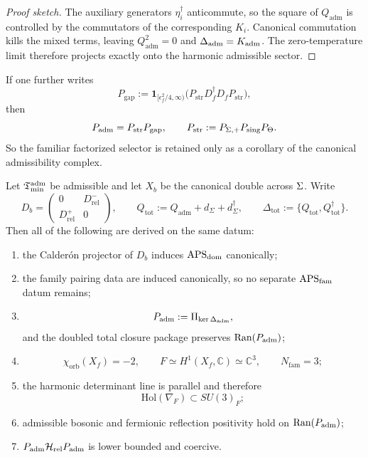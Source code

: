 \begin{proof}[Proof sketch]
The auxiliary generators $\eta_i^\dagger$ anticommute, so the square of $Q_{\mathrm{adm}}$
is controlled by the commutators of the corresponding $K_i$. Canonical commutation kills the
mixed terms, leaving $Q_{\mathrm{adm}}^2=0$ and $\Delta_{\mathrm{adm}}=K_{\mathrm{adm}}$. The
zero-temperature limit therefore projects exactly onto the harmonic admissible sector.
\end{proof}

\begin{corollary}
\label{cor:factorized-admissibility-selector}
If one further writes
\[
P_{\mathrm{gap}}:=\mathbf 1_{[\epsilon_f^2/4,\infty)}\!\bigl(P_{\mathrm{str}}D_f^\dagger D_f P_{\mathrm{str}}\bigr),
\]
then
\[
P_{\mathrm{adm}}=P_{\mathrm{str}}P_{\mathrm{gap}},
\qquad
P_{\mathrm{str}}:=P_{\Sigma,+}P_{\mathrm{sing}}P_\Theta.
\]
So the familiar factorized selector is retained only as a corollary of the canonical
admissibility complex.
\end{corollary}

\begin{theorem}
\label{thm:master-closure}
\label{ass:remaining-closure-inputs}
Let $\mathfrak T_{\mathrm{min}}^{\mathrm{adm}}$ be admissible and let $X_b$ be the canonical double across $\Sigma$.
Write
\[
D_b=
\begin{pmatrix}
0&D_{\mathrm{rel}}^-\\
D_{\mathrm{rel}}^+&0
\end{pmatrix},
\qquad
Q_{\mathrm{tot}}:=Q_{\mathrm{adm}}+d_\Sigma+d_\Sigma^\dagger,
\qquad
\Delta_{\mathrm{tot}}:=\{Q_{\mathrm{tot}},Q_{\mathrm{tot}}^\dagger\}.
\]
Then all of the following are derived on the same datum:
\begin{enumerate}[label=(\arabic*), leftmargin=1.5em, topsep=3pt, itemsep=2pt]
    \item the Calder\'on projector of $D_b$ induces $\mathrm{APS}_{\mathrm{dom}}$ canonically;
    \item the family pairing data are induced canonically, so no separate $\mathrm{APS}_{\mathrm{fam}}$ datum remains;
    \item
    \[
    P_{\mathrm{adm}}:=\Pi_{\ker \Delta_{\mathrm{adm}}},
    \]
    and the doubled total closure package preserves $\mathrm{Ran}(P_{\mathrm{adm}})$;
    \item
    \[
    \chi_{\mathrm{orb}}(X_f)=-2,
    \qquad
    F\simeq H^1(X_f,\mathbb C)\simeq \mathbb C^3,
    \qquad
    N_{\mathrm{fam}}=3;
    \]
    \item the harmonic determinant line is parallel and therefore
    \[
    \mathrm{Hol}(\nabla_F)\subset SU(3)_F;
    \]
    \item admissible bosonic and fermionic reflection positivity hold on $\mathrm{Ran}(P_{\mathrm{adm}})$;
    \item $P_{\mathrm{adm}}\mathcal H_{\mathrm{rel}}P_{\mathrm{adm}}$ is lower bounded and coercive.
\end{enumerate}
\end{theorem}

